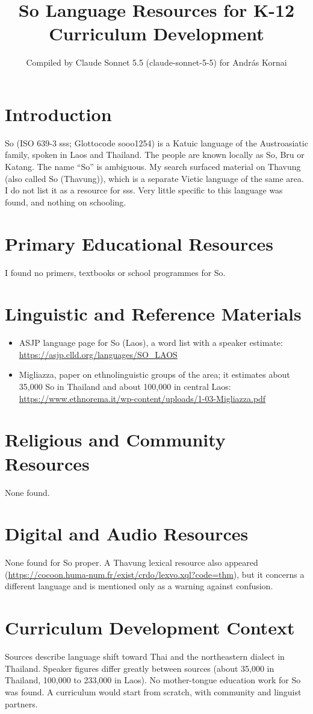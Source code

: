 \documentclass[12pt]{article}
\title{So Language Resources for K-12 Curriculum Development}
\author{Compiled by Claude Sonnet 5.5 (claude-sonnet-5-5) for Andr\'as Kornai}
\date{}
\begin{document}
\maketitle

\section{Introduction}
So (ISO 639-3 sss; Glottocode sooo1254) is a Katuic language of the Austroasiatic family, spoken in Laos and Thailand. The people are known locally as So, Bru or Katang. The name ``So'' is ambiguous. My search surfaced material on Thavung (also called So (Thavung)), which is a separate Vietic language of the same area. I do not list it as a resource for sss. Very little specific to this language was found, and nothing on schooling.

\section{Primary Educational Resources}
I found no primers, textbooks or school programmes for So.

\section{Linguistic and Reference Materials}
\begin{itemize}
\item ASJP language page for So (Laos), a word list with a speaker estimate: \url{https://asjp.clld.org/languages/SO_LAOS}
\item Migliazza, paper on ethnolinguistic groups of the area; it estimates about 35,000 So in Thailand and about 100,000 in central Laos: \url{https://www.ethnorema.it/wp-content/uploads/1-03-Migliazza.pdf}
\end{itemize}

\section{Religious and Community Resources}
None found.

\section{Digital and Audio Resources}
None found for So proper. A Thavung lexical resource also appeared (\url{https://cocoon.huma-num.fr/exist/crdo/lexvo.xql?code=thm}), but it concerns a different language and is mentioned only as a warning against confusion.

\section{Curriculum Development Context}
Sources describe language shift toward Thai and the northeastern dialect in Thailand. Speaker figures differ greatly between sources (about 35,000 in Thailand, 100,000 to 233,000 in Laos). No mother-tongue education work for So was found. A curriculum would start from scratch, with community and linguist partners.
\end{document}
